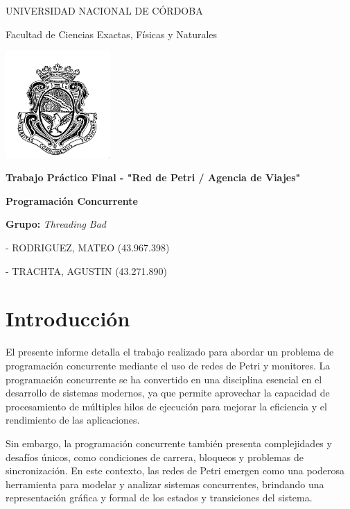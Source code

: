\documentclass[12pt]{article}
\begin{document}
\begin{titlepage}
    \centering
    {\LARGE UNIVERSIDAD NACIONAL DE CÓRDOBA \par}
    \vspace{1cm}
    {\Large Facultad de Ciencias Exactas, Físicas y Naturales \par}
    \vspace{1.5cm}
    \includegraphics[width=0.3\textwidth]{Logo-UNC.jpg} \par
    \vspace{1.5cm}
    {\LARGE \textbf{Trabajo Práctico Final - "Red de Petri / Agencia de Viajes"} \par}
    \vspace{1cm}
    {\Large \textbf{Programación Concurrente} \par}
    \vfill
    \textbf{Grupo:} \textit{Threading Bad} \par
    \vspace{0.5cm}
    - RODRIGUEZ, MATEO (43.967.398) \par
    - TRACHTA, AGUSTIN (43.271.890) \par
    \vfill
\end{titlepage}

\tableofcontents
\newpage

\section{Introducción}
El presente informe detalla el trabajo realizado para abordar un problema de programación concurrente mediante el uso de redes de Petri y monitores. La programación concurrente se ha convertido en una disciplina esencial en el desarrollo de sistemas modernos, ya que permite aprovechar la capacidad de procesamiento de múltiples hilos de ejecución para mejorar la eficiencia y el rendimiento de las aplicaciones.

Sin embargo, la programación concurrente también presenta complejidades y desafíos únicos, como condiciones de carrera, bloqueos y problemas de sincronización. En este contexto, las redes de Petri emergen como una poderosa herramienta para modelar y analizar sistemas concurrentes, brindando una representación gráfica y formal de los estados y transiciones del sistema.
\end{document}
